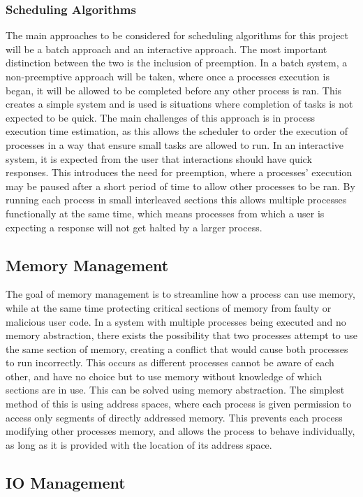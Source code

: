 \subsubsection{Scheduling Algorithms}
The main approaches to be considered for scheduling algorithms for this project will be a batch approach and an interactive approach. The most important distinction between the two is the inclusion of preemption. In a batch system, a non-preemptive approach will be taken, where once a processes execution is began, it will be allowed to be completed before any other process is ran. This creates a simple system and is used is situations where completion of tasks is not expected to be quick. The main challenges of this approach is in process execution time estimation, as this allows the scheduler to order the execution of processes in a way that ensure small tasks are allowed to run. In an interactive system, it is expected from the user that interactions should have quick responses. This introduces the need for preemption, where a processes' execution may be paused after a short period of time to allow other processes to be ran. By running each process in small interleaved sections this allows multiple processes functionally at the same time, which means processes from which a user is expecting a response will not get halted by a larger process.\cite{modern_operating}
\subsection{Memory Management}
The goal of memory management is to streamline how a process can use memory, while at the same time protecting critical sections of memory from faulty or malicious user code. In a system with multiple processes being executed and no memory abstraction, there exists the possibility that two processes attempt to use the same section of memory, creating a conflict that would cause both processes to run incorrectly. This occurs as different processes cannot be aware of each other, and have no choice but to use memory without knowledge of which sections are in use. This can be solved using memory abstraction. The simplest method of this is using address spaces, where each process is given permission to access only segments of directly addressed memory. This prevents each process modifying other processes memory, and allows the process to behave individually, as long as it is provided with the location of its address space.\cite{modern_operating}
\subsection{IO Management}
